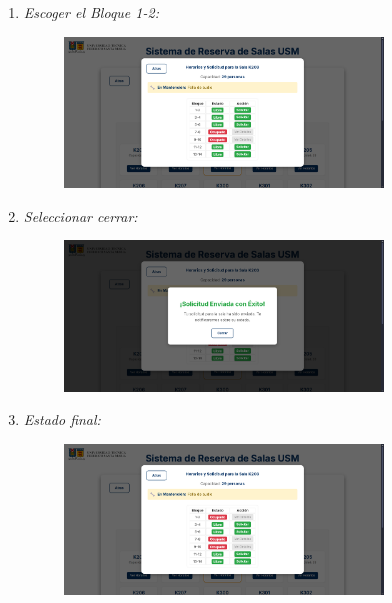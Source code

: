 \documentclass{article}
\begin{document}
\begin{enumerate}
\begin{enumerate}
            \item  \textit{Escoger el Bloque 1-2:}
            \begin{figure}[H] 
                \centering 
                \includegraphics[width=0.8\textwidth]{IMG/ss20.png} 
            \end{figure}

            \newpage
            \item  \textit{Seleccionar cerrar:}
            \begin{figure}[H] 
                \centering 
                \includegraphics[width=0.8\textwidth]{IMG/ss21.png} 
            \end{figure}

            \item  \textit{Estado final:}
            \begin{figure}[H] 
                \centering 
                \includegraphics[width=0.8\textwidth]{IMG/ss22.png} 
            \end{figure}
        \end{enumerate}


\end{enumerate}
\end{document}
